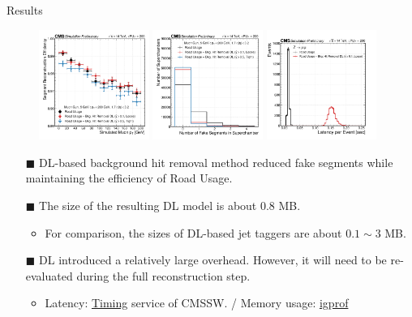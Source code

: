 \documentclass[10pt]{beamer}
\begin{document}
\begin{frame}[fragile]{Results}


\begin{figure}
    \centering
    \includegraphics[width=0.32\textwidth]{figures/BkgHitRemoval/eff_muon_pt.pdf}
    \includegraphics[width=0.32\textwidth]{figures/BkgHitRemoval/num_fake_seg_per_superchamber.pdf}
    \includegraphics[width=0.32\textwidth]{figures/BkgHitRemoval/latency.pdf}
\end{figure}

\begin{itemize}
    \item[$\blacksquare$] {\small DL-based background hit removal method reduced fake segments while maintaining the efficiency of Road Usage.}
    \item[$\blacksquare$] {\small The size of the resulting DL model is about 0.8 MB.}
    \begin{itemize}
        \item {\footnotesize For comparison, the sizes of DL-based jet taggers are about $0.1 \sim 3$ MB.}
    \end{itemize}
    \item[$\blacksquare$] {\small DL introduced a relatively large overhead. However, it  will need to be re-evaluated during the full reconstruction step. }
    \begin{itemize}
        \item {\footnotesize Latency: \href{https://github.com/cms-sw/cmssw/blob/master/FWCore/Services/plugins/Timing.cc}{Timing} service of CMSSW.} / Memory usage: \href{https://igprof.org/}{igprof}
    \end{itemize}
    \begin{itemize}
        

\end{itemize}
\end{itemize}
\end{frame}
\end{document}
